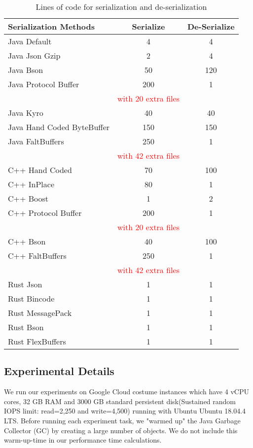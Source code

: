 \begin{table}
	\centering
	\caption{Lines of code for serialization and de-serialization  }
	\label{tbl:object_size}
	\begin{adjustbox}{width=\columnwidth,center}	
		
		\begin{tabular}{|l|c|c|} \hline
			\textbf{Serialization Methods} & \textbf{Serialize} &  \textbf{De-Serialize}   \\ \hline
			Java Default  & 4  & 4 \\ \hline	
			Java Json Gzip  & 2 & 4\\ \hline	
			Java Bson  & 50  & 120 \\ \hline	
			Java Protocol Buffer  & 200 & 1 \\ 
			                      &\textcolor{red}{with 20 extra files} &  \\ \hline	
			Java Kyro  & 40 & 40 \\ \hline	
			Java Hand Coded ByteBuffer  & 150 & 150 \\ \hline	
			Java FaltBuffers  & 250 & 1 \\ 
							  &\textcolor{red}{with 42 extra files} &  \\ \hline	
			C++ Hand Coded  & 70  & 100 \\ \hline	
			C++ InPlace  & 80 & 1 \\ \hline	
			C++ Boost  & 1 & 2 \\ \hline	
			C++ Protocol Buffer  & 200 & 1\\ 
									&\textcolor{red}{with 20 extra files} &  \\ \hline	
			C++ Bson  & 40 & 100 \\ \hline	
			C++ FaltBuffers  & 250  & 1 \\ 
									&\textcolor{red}{with 42 extra files} &  \\ 	\hline	
			Rust Json  & 1 & 1 \\ \hline
			Rust Bincode  & 1 & 1\\ \hline			
			Rust MessagePack  & 1 & 1\\ \hline			
			Rust Bson  & 1 & 1\\ \hline			
			Rust FlexBuffers  & 1 & 1\\ \hline						
			\hline\end{tabular}
	\end{adjustbox}
\end{table}




\subsection{Experimental Details}
We run our experiments on Google Cloud costume instances which have 4 vCPU cores, 32 GB RAM and 3000 GB standard persistent disk(Sustained random IOPS limit: read=2,250 and write=4,500) running with Ubuntu Ubuntu 18.04.4 LTS. Before running each experiment task, we "warmed up" the Java Garbage Collector (GC) by creating a large number of objects. We do not include this warm-up-time in our performance time calculations.

